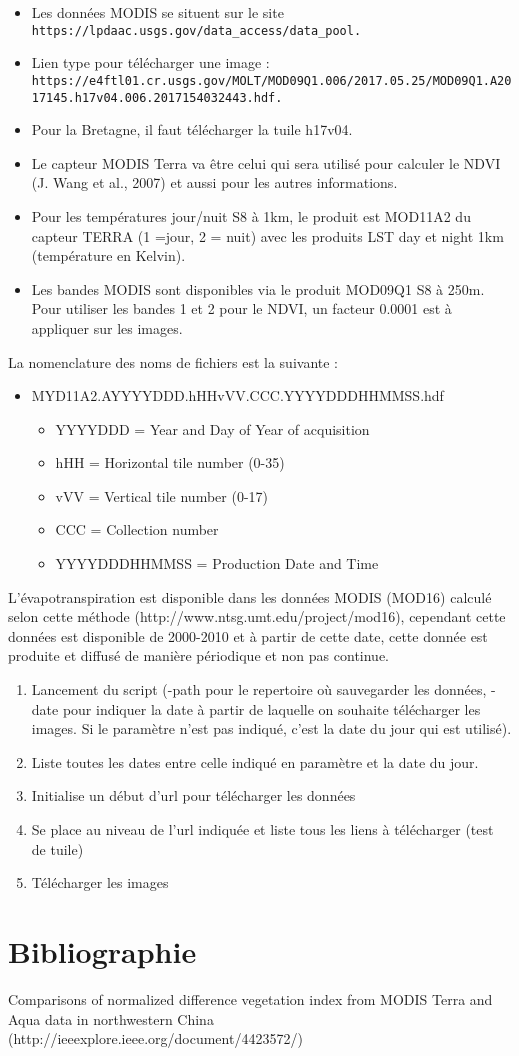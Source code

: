 \documentclass[10pt,a4paper]{article}
\begin{document}
\begin{itemize}
\item Les données MODIS se situent sur le site \verb!https://lpdaac.usgs.gov/data_access/data_pool.!
\item Lien type pour télécharger une image : \verb!https://e4ftl01.cr.usgs.gov/MOLT/MOD09Q1.006/2017.05.25/MOD09Q1.A2017145.h17v04.006.2017154032443.hdf.!
\item Pour la Bretagne, il faut télécharger la tuile h17v04. 
\item Le capteur MODIS Terra va être celui qui sera utilisé pour calculer le NDVI (J. Wang et al., 2007) et aussi pour les autres informations.
\item Pour les températures jour/nuit S8 à 1km, le produit est MOD11A2 du capteur TERRA (1 =jour, 2 = nuit) avec les produits LST day et night 1km (température en Kelvin).
\item Les bandes MODIS sont disponibles via le produit MOD09Q1 S8 à 250m. Pour utiliser les bandes 1 et 2 pour le NDVI, un facteur 0.0001 est à appliquer sur les images.
\end{itemize}  

La nomenclature des noms de fichiers est la suivante :
\begin{itemize}
\item MYD11A2.AYYYYDDD.hHHvVV.CCC.YYYYDDDHHMMSS.hdf
\begin{itemize}
\item YYYYDDD = Year and Day of Year of acquisition
\item hHH = Horizontal tile number (0-35)
\item vVV = Vertical tile number (0-17)
\item CCC = Collection number
\item YYYYDDDHHMMSS = Production Date and Time
\end{itemize}
\end{itemize}

L'évapotranspiration est disponible dans les données MODIS (MOD16) calculé selon cette méthode (http://www.ntsg.umt.edu/project/mod16), cependant cette données est disponible de 2000-2010 et à partir de cette date, cette donnée est produite et diffusé de manière périodique et non pas continue.

\begin{enumerate}
\item Lancement du script (-path pour le repertoire où sauvegarder les données, -date pour indiquer la date à partir de laquelle on souhaite télécharger les images. Si le paramètre n'est pas indiqué, c'est la date du jour qui est utilisé).
\item Liste toutes les dates entre celle indiqué en paramètre et la date du jour.
\item Initialise un début d'url pour télécharger les données
\item Se place au niveau de l'url indiquée et liste tous les liens à télécharger (test de tuile)
\item Télécharger les images
\end{enumerate}

\section{Bibliographie}

Comparisons of normalized difference vegetation index from MODIS Terra and Aqua data in northwestern China (http://ieeexplore.ieee.org/document/4423572/)
\end{document}
